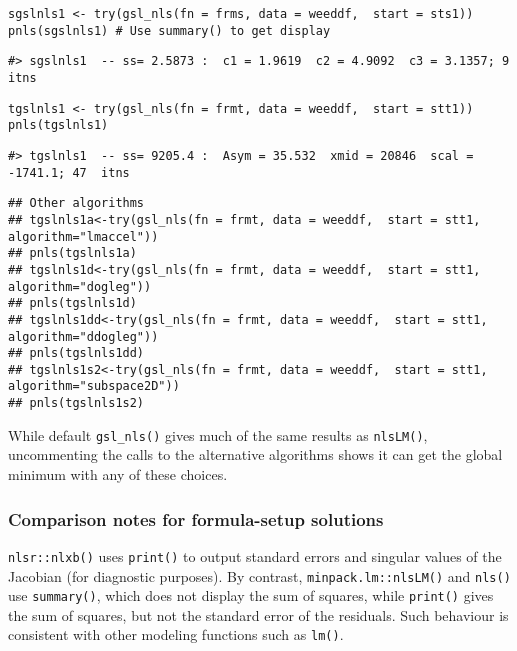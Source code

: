 \begin{verbatim}
sgslnls1 <- try(gsl_nls(fn = frms, data = weeddf,  start = sts1))
pnls(sgslnls1) # Use summary() to get display
\end{verbatim}

\begin{verbatim}
#> sgslnls1  -- ss= 2.5873 :  c1 = 1.9619  c2 = 4.9092  c3 = 3.1357; 9  itns
\end{verbatim}

\begin{verbatim}
tgslnls1 <- try(gsl_nls(fn = frmt, data = weeddf,  start = stt1))
pnls(tgslnls1) 
\end{verbatim}

\begin{verbatim}
#> tgslnls1  -- ss= 9205.4 :  Asym = 35.532  xmid = 20846  scal = -1741.1; 47  itns
\end{verbatim}

\begin{verbatim}
## Other algorithms
## tgslnls1a<-try(gsl_nls(fn = frmt, data = weeddf,  start = stt1, algorithm="lmaccel"))
## pnls(tgslnls1a) 
## tgslnls1d<-try(gsl_nls(fn = frmt, data = weeddf,  start = stt1, algorithm="dogleg"))
## pnls(tgslnls1d) 
## tgslnls1dd<-try(gsl_nls(fn = frmt, data = weeddf,  start = stt1, algorithm="ddogleg"))
## pnls(tgslnls1dd) 
## tgslnls1s2<-try(gsl_nls(fn = frmt, data = weeddf,  start = stt1, algorithm="subspace2D"))
## pnls(tgslnls1s2) 
\end{verbatim}

While default \texttt{gsl\_nls()} gives much of the same results as \texttt{nlsLM()}, uncommenting the
calls to the alternative algorithms shows it can get the global minimum with any of
these choices.

\hypertarget{comparison-notes-for-formula-setup-solutions}{%
\subsubsection{Comparison notes for formula-setup solutions}\label{comparison-notes-for-formula-setup-solutions}}

\texttt{nlsr::nlxb()} uses \texttt{print()} to output standard errors and
singular values of the Jacobian (for diagnostic purposes). By contrast,
\texttt{minpack.lm::nlsLM()} and \texttt{nls()}
use \texttt{summary()}, which does not display the sum of squares, while \texttt{print()}
gives the sum of squares, but not the standard error of the residuals.
Such behaviour is consistent with other modeling functions such as \texttt{lm()}.

